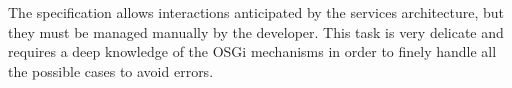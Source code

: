 \begin{itemize}
	The specification allows interactions anticipated by the services architecture, but they must be managed manually by the developer.
	This task is very delicate and requires a deep knowledge of the OSGi mechanisms in order to finely handle all the possible cases to avoid errors.





\end{itemize}
